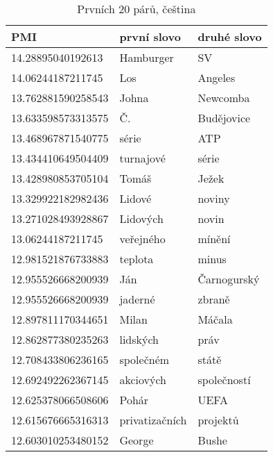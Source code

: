 \documentclass[12pt, a4paper]{report}
\theoremstyle{remark}
\begin{document}
\begin{table}[h!]
\begin{tabular}{lll}
         PMI & první slovo & druhé slovo \\
\toprule
14.28895040192613 & Hamburger & SV \\
14.06244187211745 & Los & Angeles \\
13.762881590258543 & Johna & Newcomba \\
13.633598573313575 & Č. & Budějovice \\
13.468967871540775 & série & ATP \\
13.434410649504409 & turnajové & série \\
13.428980853705104 & Tomáš & Ježek \\
13.329922182982436 & Lidové & noviny \\
13.271028493928867 & Lidových & novin \\
13.06244187211745 & veřejného & mínění \\
12.981521876733883 & teplota & minus \\
12.955526668200939 & Ján & Čarnogurský \\
12.955526668200939 & jaderné & zbraně \\
12.897811170344651 & Milan & Máčala \\
12.862877380235263 & lidských & práv \\
12.708433806236165 & společném & státě \\
12.692492262367145 & akciových & společností \\
12.625378066508606 & Pohár & UEFA \\
12.615676665316313 & privatizačních & projektů \\
12.603010253480152 & George & Bushe \\
\end{tabular}
\caption{Prvních 20 párů, čeština}
\end{table}
\end{document}
